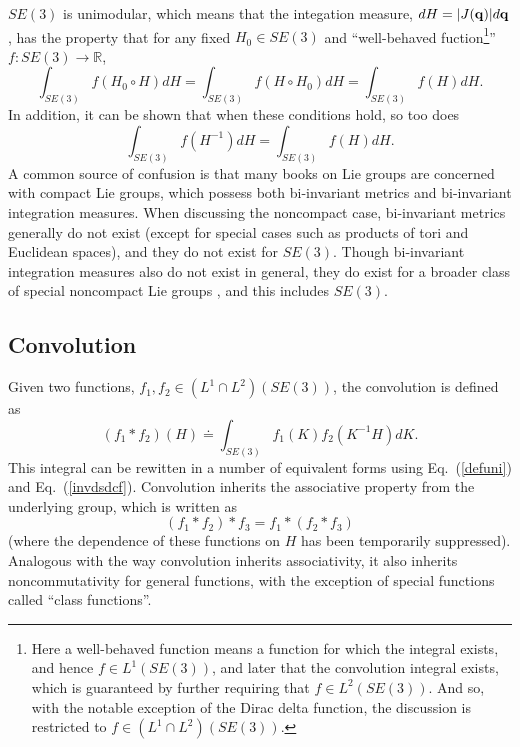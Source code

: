 \documentclass[twocolumn,10pt]{asme2ej}
\begin{document}
$SE(3)$ is unimodular, which means that the integation measure, $dH = |J({\bf q})| d{\bf q}$, has the property that for any
fixed $H_0 \in SE(3)$ and ``well-behaved fuction\footnote{Here a well-behaved function means a function for which the integral exists, and hence
$f \in L^1(SE(3))$, and later that the convolution integral exists, which is guaranteed by further requiring that
$f \in L^2(SE(3))$. And so, with the notable exception of the Dirac delta function, the discussion is restricted to
$f \in (L^1 \cap L^2)(SE(3))$.}'' $f:SE(3) \rightarrow \mathbb{R}$, \cite{myoldbook}
\begin{equation}
\int_{SE(3)} f(H_0 \circ H) dH = \int_{SE(3)} f(H \circ H_0) dH = \int_{SE(3)} f(H) dH.
\label{defuni}
\end{equation}
In addition, it can be shown that when these conditions hold, so too does
\begin{equation}
\int_{SE(3)} f(H^{-1}) dH = \int_{SE(3)} f(H) dH.
\label{invdsdcf}
\end{equation}
A common source of confusion is that many books on Lie groups are concerned with compact Lie groups, which possess both bi-invariant metrics
and bi-invariant integration measures. When discussing the noncompact case, bi-invariant metrics generally do not exist (except for special cases
such as products of tori and Euclidean spaces), and they do not exist for $SE(3)$. Though bi-invariant integration measures also do not exist in general,
they do exist for a broader class of special noncompact Lie groups%
, and this includes $SE(3)$. 

\subsection*{Convolution} \label{convsec}

Given two functions, $f_1, f_2 \in (L^1 \cap L^2)(SE(3))$, the convolution is defined as
\begin{equation}
(f_1 * f_2)(H) \doteq \int_{SE(3)} f_1(K) f_2(K^{-1} H) dK. 
\label{convdef}
\end{equation}
This integral can be rewitten in a number of equivalent forms using Eq.~(\ref{defuni}) and Eq.~(\ref{invdsdcf}).
Convolution inherits the associative property from the underlying group, which is written as 
$$ (f_1 * f_2) * f_3 = f_1 * (f_2 * f_3) $$
(where the dependence of these functions on $H$ has been temporarily suppressed). Analogous with the way convolution inherits associativity, it 
also inherits noncommutativity for general functions, with the exception of special functions called ``class functions''.
\end{document}
